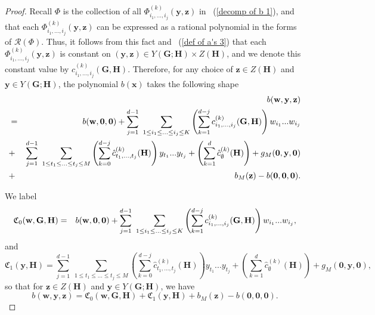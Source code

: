 \documentclass[12pt]{amsart}
\theoremstyle{definition}
\theoremstyle{remark}
\numberwithin{equation}{section}
\begin{document}
\begin{proof}
Recall $\Phi$ is the collection of all $\Phi^{(k)}_{i_1, ..., i_{j}} ( \mathbf{y}, \mathbf{z} )$ in ~(\ref{decomp of b 1}), and
that each $\Phi^{(k)}_{i_1, ..., i_{j}} ( \mathbf{y}, \mathbf{z} )$ can be expressed as
a rational polynomial in the forms of $\mathcal{R}(\Phi)$.
Thus, it follows from this fact and ~(\ref{def of a's 3}) that each $\Phi^{(k)}_{i_1, ..., i_{j}} ( \mathbf{y}, \mathbf{z} )$
is constant on $(\mathbf{y}, \mathbf{z}) \in Y(\mathbf{G};\mathbf{H}) \times Z(\mathbf{H})$, and we denote this constant value by
${c}^{(k)}_{i_1, ..., i_{j}} ( \mathbf{G}, \mathbf{H} )$.
Therefore, for any choice of $\mathbf{z} \in Z(\mathbf{H})$ and $ \mathbf{y} \in  Y(\mathbf{G};\mathbf{H})$, the polynomial ${b}(\mathbf{x})$ takes the following
shape
\begin{eqnarray}
&&{b}( \mathbf{w}, \mathbf{y}, \mathbf{z} )
\label{decom of b with coeff}
\\
&=&
{b}( \mathbf{w}, \mathbf{0}, \mathbf{0})
+ \sum_{j=1}^{d-1}  \ \sum_{1 \leq i_1 \leq ... \leq i_j \leq K}
\left( \sum_{k=1}^{d-j} {c}^{(k)}_{i_1, ..., i_{j}} ( \mathbf{G}, \mathbf{H} )  \right) w_{i_1} ... w_{i_j}
\notag
\\
&+&
\sum_{j=1}^{d-1} \ \sum_{1 \leq t_1 \leq ... \leq t_{j} \leq M}
\left( \sum_{k=0}^{d-j} {\hat{c} }^{(k)}_{ t_1, ..., t_{j}} ( \mathbf{H} )  \right) y_{t_1} ... y_{t_{j}}
+
\left( \sum_{k=1}^{d} {\hat{c}}^{(k)}_{\emptyset} ( \mathbf{H} )  \right)
+ g_M( \mathbf{0}, \mathbf{y}, \mathbf{0} )
\notag
\\
&+& b_M(\mathbf{z}) - b(\mathbf{0}, \mathbf{0}, \mathbf{0}).
\notag
\end{eqnarray}

We label
\begin{eqnarray}
\mathfrak{C}_0 (\mathbf{w}, \mathbf{G}, \mathbf{H}  ) &=& {b}(\mathbf{w}, \mathbf{0}, \mathbf{0} )
+ \sum_{j=1}^{d-1}  \ \sum_{1 \leq i_1 \leq ... \leq i_j \leq K}
\left( \sum_{k=1}^{d-j} {c}^{(k)}_{i_1, ..., i_{j}} ( \mathbf{G}, \mathbf{H} )  \right) w_{i_1} ... w_{i_j},
\notag
\end{eqnarray}
and
$$
\mathfrak{C}_1 (\mathbf{y}, \mathbf{H} ) = \sum_{j=1}^{d-1} \ \sum_{1 \leq t_1 \leq ... \leq t_{j} \leq M}
\left( \sum_{k=0}^{d-j} {\hat{c}}^{(k)}_{ t_1, ..., t_{j}} ( \mathbf{H} )  \right) y_{t_1} ... y_{t_{j}}
+
\left( \sum_{k=1}^{d} {\hat{c}}^{(k)}_{\emptyset} ( \mathbf{H} )  \right)
+ g_M( \mathbf{0}, \mathbf{y}, \mathbf{0} ),
$$
so that for $\mathbf{z} \in Z(\mathbf{H})$ and $ \mathbf{y} \in  Y(\mathbf{G};\mathbf{H})$, we have
$$
{b}(\mathbf{w}, \mathbf{y}, \mathbf{z}  ) =  \mathfrak{C}_0 (\mathbf{w}, \mathbf{G}, \mathbf{H}  ) + \mathfrak{C}_1 (\mathbf{y}, \mathbf{H} ) +
b_M(\mathbf{z}) - b(\mathbf{0}, \mathbf{0}, \mathbf{0}).
$$


\end{proof}
\end{document}

